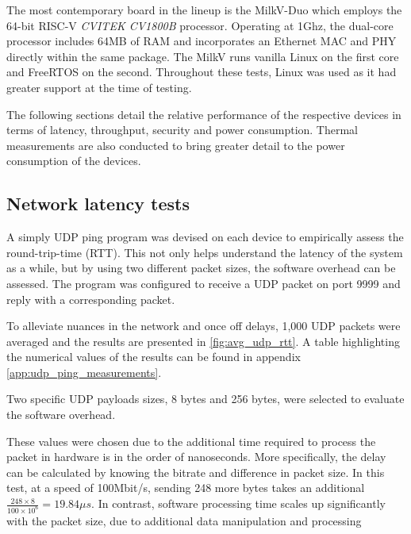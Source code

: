 The most contemporary board in the lineup is the MilkV-Duo which employs the 64-bit RISC-V \textit{CVITEK CV1800B} processor. Operating at 1Ghz, the dual-core processor includes 64MB of RAM and incorporates an Ethernet MAC and PHY directly within the same package. The MilkV runs vanilla Linux on the first core and FreeRTOS on the second. Throughout these tests, Linux was used as it had greater support at the time of testing. 

The following sections detail the relative performance of the respective devices in terms of latency, throughput, security and power consumption. Thermal measurements are also conducted to bring greater detail to the power consumption of the devices.



\subsection{Network latency tests}


A simply UDP ping program was devised on each device to empirically assess the round-trip-time (RTT). This not only helps understand the latency of the system as a while, but by using two different packet sizes, the software overhead can be assessed. The program was configured to receive a UDP packet on port 9999 and reply with a corresponding packet. 

To alleviate nuances in the network and once off delays, 1,000 UDP packets were averaged and the results are presented in \ref{fig:avg_udp_rtt}. A table highlighting the numerical values of the results can be found in appendix \ref{app:udp_ping_measurements}.

Two specific UDP payloads sizes, 8 bytes and 256 bytes, were selected to evaluate the software overhead. 

These values were chosen due to the additional time required to process the packet in hardware is in the order of nanoseconds. More specifically, the delay can be calculated by knowing the bitrate and difference in packet size. In this test, at a speed of 100Mbit/s, sending 248 more bytes takes an additional $\frac{248 \times 8}{100 \times 10^6}=19.84\mu s$. In contrast, software processing time scales up significantly with the packet size, due to additional data manipulation and processing

